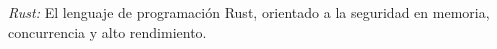 \textit{Rust:} El lenguaje de programación Rust, orientado a la seguridad en memoria, concurrencia y alto rendimiento. 









